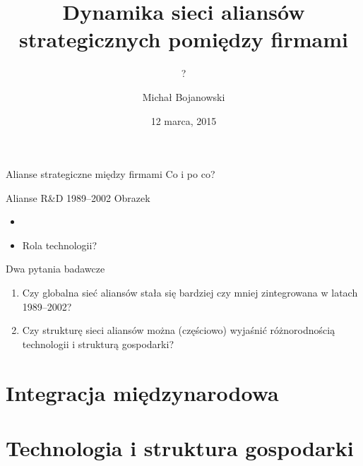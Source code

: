 \documentclass{beamer}
\title{Dynamika sieci aliansów strategicznych pomiędzy firmami}
\subtitle{?}
\author{Michał Bojanowski}
\date{12 marca, 2015}
\institute{ICM UW}
\begin{document}
\begin{frame}
	\titlepage
\end{frame}

\begin{frame}{Alianse strategiczne między firmami}
	Co i po co?
\end{frame}

\begin{frame}{Alianse R\&D 1989--2002}
	Obrazek

	\begin{itemize}
		\item 
		\item Rola technologii?
	\end{itemize}
\end{frame}



\begin{frame}{Dwa pytania badawcze}
	\begin{enumerate}
		\item Czy globalna sieć aliansów stała się bardziej czy mniej zintegrowana
			w latach 1989--2002?
		\item Czy strukturę sieci aliansów można (częściowo) wyjaśnić
			różnorodnością technologii i strukturą gospodarki?
	\end{enumerate}
\end{frame}


\section{Integracja międzynarodowa}

\begin{frame}
\end{frame}



\section{Technologia i struktura gospodarki}
\end{document}
